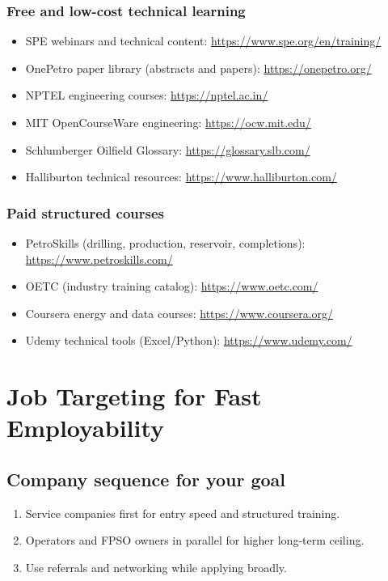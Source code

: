 \documentclass[11pt,openany]{book}
\begin{document}
\subsection{Free and low-cost technical learning}
\begin{itemize}
  \item SPE webinars and technical content: \url{https://www.spe.org/en/training/}
  \item OnePetro paper library (abstracts and papers): \url{https://onepetro.org/}
  \item NPTEL engineering courses: \url{https://nptel.ac.in/}
  \item MIT OpenCourseWare engineering: \url{https://ocw.mit.edu/}
  \item Schlumberger Oilfield Glossary: \url{https://glossary.slb.com/}
  \item Halliburton technical resources: \url{https://www.halliburton.com/}
\end{itemize}

\subsection{Paid structured courses}
\begin{itemize}
  \item PetroSkills (drilling, production, reservoir, completions): \url{https://www.petroskills.com/}
  \item OETC (industry training catalog): \url{https://www.oetc.com/}
  \item Coursera energy and data courses: \url{https://www.coursera.org/}
  \item Udemy technical tools (Excel/Python): \url{https://www.udemy.com/}
\end{itemize}

\chapter{Job Targeting for Fast Employability}

\section{Company sequence for your goal}
\begin{enumerate}
  \item Service companies first for entry speed and structured training.
  \item Operators and FPSO owners in parallel for higher long-term ceiling.
  \item Use referrals and networking while applying broadly.
\end{enumerate}
\end{document}
